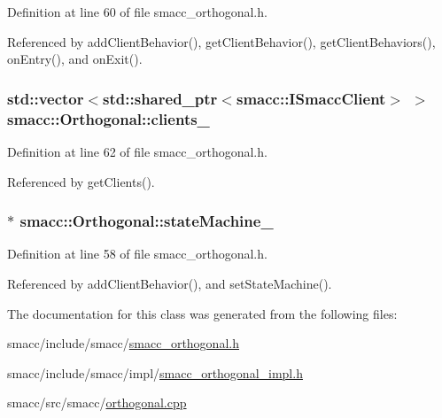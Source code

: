 Definition at line 60 of file smacc\+\_\+orthogonal.\+h.



Referenced by add\+Client\+Behavior(), get\+Client\+Behavior(), get\+Client\+Behaviors(), on\+Entry(), and on\+Exit().

\subsubsection[{\texorpdfstring{clients\+\_\+}{clients_}}]{\setlength{\rightskip}{0pt plus 5cm}std\+::vector$<$std\+::shared\+\_\+ptr$<${\bf smacc\+::\+I\+Smacc\+Client}$>$ $>$ smacc\+::\+Orthogonal\+::clients\+\_\+\hspace{0.3cm}{\ttfamily [private]}}\hypertarget{classsmacc_1_1Orthogonal_a361fd1c4a5b0e6eadd55e919c19969cc}{}\label{classsmacc_1_1Orthogonal_a361fd1c4a5b0e6eadd55e919c19969cc}


Definition at line 62 of file smacc\+\_\+orthogonal.\+h.



Referenced by get\+Clients().

\subsubsection[{\texorpdfstring{state\+Machine\+\_\+}{stateMachine_}}]{$\ast$ smacc\+::\+Orthogonal\+::state\+Machine\+\_\+\hspace{0.3cm}{\ttfamily [private]}}\hypertarget{classsmacc_1_1Orthogonal_acea2058ac94667e46fc60ed3d4f524f7}{}\label{classsmacc_1_1Orthogonal_acea2058ac94667e46fc60ed3d4f524f7}


Definition at line 58 of file smacc\+\_\+orthogonal.\+h.



Referenced by add\+Client\+Behavior(), and set\+State\+Machine().



The documentation for this class was generated from the following files\+:\begin{DoxyCompactItemize}
\item 
smacc/include/smacc/\hyperlink{smacc__orthogonal_8h}{smacc\+\_\+orthogonal.\+h}\item 
smacc/include/smacc/impl/\hyperlink{smacc__orthogonal__impl_8h}{smacc\+\_\+orthogonal\+\_\+impl.\+h}\item 
smacc/src/smacc/\hyperlink{orthogonal_8cpp}{orthogonal.\+cpp}\end{DoxyCompactItemize}
